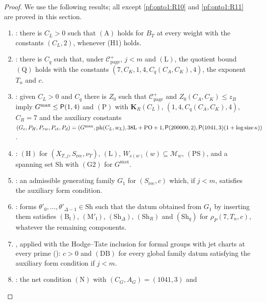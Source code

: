 \begin{proof}
We use the following results; all except \ref{pf:onto1:R10} and \ref{pf:onto1:R11} are proved in this section.
\begin{enumerate}[label=(R\arabic*)]
\item\label{pf:onto1:R1} : there is $C_L>0$ such that $(\mathrm A)$ holds for $B_T$ at every weight with the
constants $(C_L,2)$, whenever (H1) holds.
\item\label{pf:onto1:R2} : there is $C_q$ such that, under $\mathcal C^+_{\mathrm{page}}$, $j<m$ and $(\mathrm L)$,
the quotient bound $(\mathrm Q)$ holds with the constants $(7,C_K,1,4,C_q(C_A,C_K),4)$, the exponent $T_n$ and $c$.
\item\label{pf:onto1:R3} : given $C_L>0$ and $C_q$ there is $Z_0$ such that $\mathcal C^+_{\mathrm{page}}$ and
$Z_0(C_A,C_K)\le z_B$ imply $G^{\max}\le\mathsf{P}(1,4)$ and $(\mathrm P)$ with $\mathbf K_R(C_L)$, $(1,4,C_q(C_A,C_K),4)$, $C_R=7$ and the
auxiliary constants $(G_c,P_H,P_{rw},P_{et},P_d)=(G^{\max},\mathrm{ph}(C_L,w_L),38\mathrm L+\mathrm{PO}+1,\mathsf{P}(200000,2),
\mathsf{P}(1041,3)(1+\log\operatorname{size}\kappa))$.
\item\label{pf:onto1:R4} : $(\mathrm H)$ for $(X_{T,j},S_{\mathrm{rec}},\nu_T)$, $(\mathrm L)$, $W_{s(w)}(w)\subseteq\mathcal
M_w$, $(\mathrm{PS})$, and a spanning set $\mathrm{Sh}$ with $(\mathrm G2)$ for $G^{\max}$.
\item\label{pf:onto1:R5} : an admissible generating family $G_1$ for $(S_{\mathrm{rec}},c)$ which, if
$j<m$, satisfies the auxiliary form condition.
\item\label{pf:onto1:R6} : forms $\theta'_0,\dots,\theta'_{\Delta-1}\in\mathrm{Sh}$ such that the datum obtained from
$G_1$ by inserting them satisfies $(\mathrm B_{\mathfrak l})$, $(\mathrm M'_{\mathfrak l})$, $(\mathrm{Sh}_\Delta)$, $(\mathrm{Sh}_R)$ and
$(\mathrm{Sh}_q)$ for $\rho_P(7,T_n,c)$, whatever the remaining components.
\item\label{pf:onto1:R7} , applied with the Hodge--Tate inclusion for formal groups with jet charts at
every prime (): $c>0$ and $(\mathrm{DB})$ for every global family datum
satisfying the auxiliary form condition if $j<m$.
\item\label{pf:onto1:R8} : the net condition $(\mathrm N)$ with $(C_G,A_G)=(1041,3)$ and

\end{enumerate}
\end{proof}
